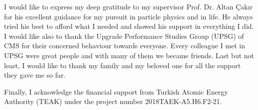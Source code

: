 \vspace*{-6pt}

I would like to express my deep gratitude to my supervisor Prof. Dr. Altan Çakır for his excellent guidance for my pursuit in particle physics and in life. He always tried his best to afford what I needed and showed his support in everything I did. I would like also to thank the Upgrade Performance Studies Group (UPSG) of CMS for their concerned behaviour towards everyone. Every colleague I met in UPSG were great people and with many of them we became friends. Last but not least, I would like to thank my family and my beloved one for all the support they gave me so far.

Finally, I acknowledge the financial support from Turkish Atomic Energy Authority (TEAK) under the project number 2018TAEK-A5.H6.F2-21.

